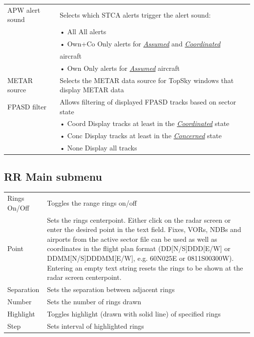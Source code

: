 \documentclass[a4paper,oneside,11pt]{memoir}
\newcommand{\stateref}[1]{\textit{\hyperref[state:#1]{#1}}}
\begin{document}
\begin{longtable}{p{5cm} p{7.5cm}}
  APW alert sound         & Selects which STCA alerts trigger the alert sound:\\                          & \hspace{10pt}• All All alerts\\                          & \hspace{10pt}• Own+Co Only alerts for \stateref{Assumed} and \stateref{Coordinated}\\                          & aircraft\\                          & \hspace{10pt}• Own Only alerts for \stateref{Assumed} aircraft\\
  METAR source            & Selects the METAR data source for TopSky windows that display METAR data\\
  FPASD filter            & Allows filtering of displayed FPASD tracks based on sector state\\                          & \hspace{10pt}• Coord Display tracks at least in the \stateref{Coordinated} state\\                          & \hspace{10pt}• Conc Display tracks at least in the \stateref{Concerned} state\\                          & \hspace{10pt}• None Display all tracks\\
\end{longtable}
\medskip

\subsection*{RR Main submenu}
\label{menu:rr}

\begin{longtable}{p{5cm} p{7.5cm}}
  Rings On/Off   & Toggles the range rings on/off                                 \\
  Point             & Sets the rings centerpoint. Either click on the radar screen or enter the desired point in the text field. Fixes, VORs, NDBs and airports from the active sector file can be used as well as coordinates in the flight plan format (DD[N/S]DDD[E/W] or DDMM[N/S]DDDMM[E/W], e.g. 60N025E or 0811S00300W). Entering an empty text string resets the rings to be shown at the radar screen centerpoint.\\
  Separation        & Sets the separation between adjacent rings                  \\
  Number            & Sets the number of rings drawn                              \\
  Highlight      & Toggles highlight (drawn with solid line) of specified rings   \\
  Step              & Sets interval of highlighted rings                          \\
\end{longtable}
\end{document}
